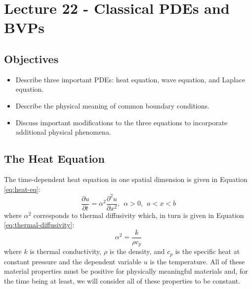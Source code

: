 \chapter{Lecture 22 - Classical PDEs and BVPs}
\label{ch:lec22}
\section{Objectives}
\begin{itemize}
\item Describe three important PDEs: heat equation, wave equation, and Laplace equation.
\item Describe the physical meaning of common boundary conditions.
\item Discuss important modifications to the three equations to incorporate additional physical phenomena.
\end{itemize}

\section{The Heat Equation}
The time-dependent heat equation in one spatial dimension is given in Equation \ref{eq:heat-eq}:
\begin{equation}
\frac{\partial u}{\partial t} = \alpha^2\frac{\partial^2 u}{\partial x^2}, \ \ \alpha > 0, \ \ a<x<b
\label{eq:heat-eq}
\end{equation}
where $\alpha^2$ corresponds to thermal diffusivity which, in turn is given in Equation \ref{eq:thermal-diffusivity}:
\begin{equation}
\alpha^2 = \frac{k}{\rho c_p}
\label{eq:thermal-diffusivity}
\end{equation}
where $k$ is thermal conductivity, $\rho$ is the density, and $c_p$ is the specific heat at constant pressure and the dependent variable $u$ is the temperature.  All of these material properties must be positive for physically meaningful materials and, for the time being at least, we will consider all of these properties to be constant.

